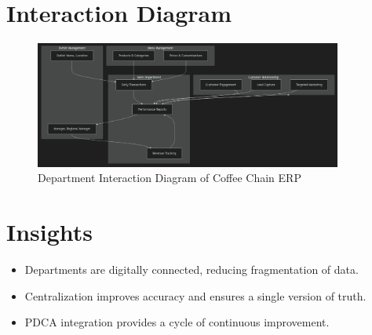 \section*{Interaction Diagram}
\begin{figure}[H]
\centering
\includegraphics[width=0.9\textwidth,height=0.5\textheight,keepaspectratio]{diagrams/department.png}
\caption{Department Interaction Diagram of Coffee Chain ERP}
\end{figure}

\section*{Insights}
\begin{itemize}
    \item Departments are digitally connected, reducing fragmentation of data.  
    \item Centralization improves accuracy and ensures a single version of truth.  
    \item PDCA integration provides a cycle of continuous improvement.  
\end{itemize}
